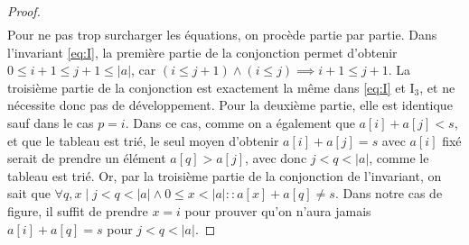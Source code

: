 \documentclass{elsarticle}
\newcommand{\abs}[1]{\left\lvert#1\right\lvert}
\begin{document}
\begin{minipage}[c]{0.65\textwidth}
\begin{proof}
\begin{align*}
\end{align*}
Pour ne pas trop surcharger les équations, on procède partie par partie.
Dans l'invariant \ref{eq:I}, la première partie de la conjonction permet d'obtenir $0 \le i +1 \le j+1 \le \abs{a}$,
car $(i \le j+1) \land (i \le j) \implies i+1 \le j+1$.
La troisième partie de la conjonction est exactement la même dans \ref{eq:I} et I$_3$,
et ne nécessite donc pas de développement.
Pour la deuxième partie, elle est identique sauf dans le cas $p = i$.
Dans ce cas, comme on a également que $a[i] + a[j] < s$,
et que le tableau est trié, le seul moyen d'obtenir $a[i] + a[j] = s$ avec $a[i]$ fixé serait de prendre un élément $a[q] > a[j]$, avec donc $j  < q < \abs{a}$, comme le tableau est trié.
Or, par la troisième partie de la conjonction de l'invariant, on sait que $\forall q, x \mid j < q < \abs{a} \land 0 \le x < \abs{a} :: a[x] + a[q] \ne s$.
Dans notre cas de figure, il suffit de prendre $x = i$ pour prouver qu'on n'aura jamais $a[i] + a[q] = s$ pour $j < q < \abs{a}$.
\end{proof}
\end{minipage}
\end{document}
